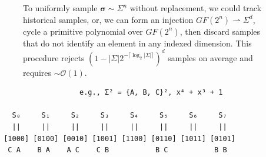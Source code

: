 \documentclass{beamer}
\begin{document}
\begin{frame}[fragile]
\begin{figure}
\begin{minipage}[l]{5cm}
        \end{minipage}\hspace{1cm}
        \begin{minipage}[c]{5.5cm}
        To uniformly sample $\bm\sigma \sim \Sigma^n$ without replacement, we could track historical samples, or, we can form an injection $GF(2^n)\rightharpoonup\Sigma^d$, cycle a primitive polynomial over $GF(2^n)$, then discard samples that do not identify an element in any indexed dimension. This procedure rejects $(1 - |\Sigma|2^{-\lceil\log_2|\Sigma|\rceil})^d$ samples on average and requires $\sim\mathcal{O}(1)$.
        \end{minipage}
        \end{figure}
        \begin{small}
            \begin{verbatim}
                   e.g., Σ² = {A, B, C}², x⁴ + x³ + 1

   S₀     S₁     S₂     S₃     S₄     S₅     S₆     S₇
   ||     ||     ||     ||     ||     ||     ||     ||
 [1000] [0100] [0010] [1001] [1100] [0110] [1011] [0101]
  C A    B A    A C    C B           B C           B B
            \end{verbatim}
        \end{small}
    \egroup
    \end{frame}
\end{document}
